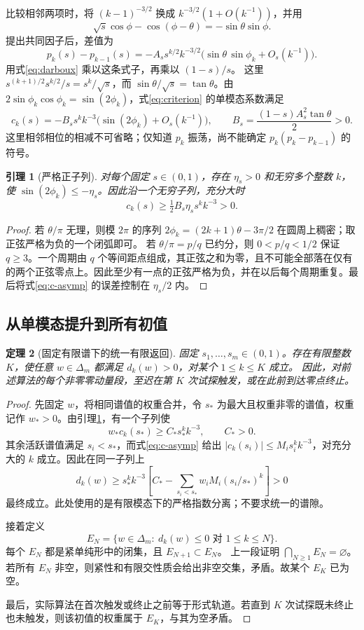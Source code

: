 \documentclass[11pt,a4paper,UTF8,fontset=fandol]{ctexart}
\newtheorem{theorem}{定理}[section]
\newtheorem{lemma}[theorem]{引理}
\theoremstyle{remark}\newtheorem{remark}[theorem]{说明}
\begin{document}
比较相邻两项时，将 $(k-1)^{-3/2}$ 换成 $k^{-3/2}(1+O(k^{-1}))$，并用
\[
 \sqrt{s}\cos\phi-\cos(\phi-\theta)
 =-\sin\theta\sin\phi.
\]
提出共同因子后，差值为
\[
 p_k(s)-p_{k-1}(s)
 =-A_s s^{k/2}k^{-3/2}
   \bigl(\sin\theta\,\sin\phi_k+O_s(k^{-1})\bigr).
\]
用式\eqref{eq:darboux} 乘以这条式子，再乘以 \((1-s)/s\)。
这里 \(s^{(k+1)/2}s^{k/2}/s=s^k/\sqrt{s}\)，而 \(\sin\theta/\sqrt{s}=\tan\theta\)。由 \(2\sin\phi_k\cos\phi_k=\sin(2\phi_k)\)，式\eqref{eq:criterion} 的单模态系数满足
\begin{equation}\label{eq:c-asymp}
 c_k(s)=-B_s s^k k^{-3}
 \bigl(\sin(2\phi_k)+O_s(k^{-1})\bigr),\qquad
 B_s=\frac{(1-s)A_s^2\tan\theta}{2}>0.
\end{equation}
这里相邻相位的相减不可省略；仅知道 $p_k$ 振荡，尚不能确定 $p_k(p_k-p_{k-1})$ 的符号。

\begin{lemma}[严格正子列]\label{lem:positive-subsequence}
对每个固定 $s\in(0,1)$，存在 $\eta_s>0$ 和无穷多个整数 $k$，使
$\sin(2\phi_k)\le-\eta_s$。因此沿一个无穷子列，充分大时
\[
 c_k(s)\ge\tfrac12 B_s\eta_s s^k k^{-3}>0.
\]
\end{lemma}
\begin{proof}
若 $\theta/\pi$ 无理，则模 $2\pi$ 的序列
$2\phi_k=(2k+1)\theta-3\pi/2$ 在圆周上稠密；取正弦严格为负的一个闭弧即可。
若 $\theta/\pi=p/q$ 已约分，则 $0<p/q<1/2$ 保证 $q\ge3$。一个周期由 $q$ 个等间距点组成，其正弦之和为零，且不可能全部落在仅有的两个正弦零点上。因此至少有一点的正弦严格为负，并在以后每个周期重复。最后将式\eqref{eq:c-asymp} 的误差控制在 $\eta_s/2$ 内。
\end{proof}

\subsection{从单模态提升到所有初值}
\begin{theorem}[固定有限谱下的统一有限返回]\label{thm:return}
固定 $s_1,\ldots,s_m\in(0,1)$。存在有限整数 $K$，使任意
$w\in\Delta_m$ 都满足 $d_k(w)>0$，对某个 $1\le k\le K$ 成立。
因此，对前述算法的每个非零零动量段，至迟在第 $K$ 次试探触发，或在此前到达零点终止。
\end{theorem}
\begin{proof}
先固定 $w$，将相同谱值的权重合并，令 $s_*$ 为最大且权重非零的谱值，权重记作 $w_*>0$。由引理\ref{lem:positive-subsequence}，有一个子列使
\[
 w_*c_k(s_*)\ge C_*s_*^k k^{-3},\qquad C_*>0.
\]
其余活跃谱值满足 $s_i<s_*$，而式\eqref{eq:c-asymp} 给出
$|c_k(s_i)|\le M_i s_i^k k^{-3}$，对充分大的 $k$ 成立。因此在同一子列上
\[
 d_k(w)\ge s_*^k k^{-3}
 \left[C_*-\sum_{s_i<s_*}w_iM_i(s_i/s_*)^k\right]>0
\]
最终成立。此处使用的是有限模态下的严格指数分离；不要求统一的谱隙。

接着定义
\[
 E_N=\{w\in\Delta_m:\ d_k(w)\le0\text{ 对 }1\le k\le N\}.
\]
每个 $E_N$ 都是紧单纯形中的闭集，且 $E_{N+1}\subset E_N$。
上一段证明 $\bigcap_{N\ge1}E_N=\varnothing$。若所有 $E_N$ 非空，则紧性和有限交性质会给出非空交集，矛盾。故某个 $E_K$ 已为空。

最后，实际算法在首次触发或终止之前等于形式轨道。若直到 $K$ 次试探既未终止也未触发，则该初值的权重属于 $E_K$，与其为空矛盾。
\end{proof}
\end{document}
